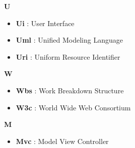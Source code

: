 {\huge \textbf{U}}
\begin{flushleft}
\begin{itemize}[label={}]
\item \textbf{Ui} : User Interface
\item \textbf{Uml} : Unified Modeling Language
\item \textbf{Uri} : Uniform Resource Identifier
\end{itemize}
\end{flushleft}
{\huge \textbf{W}}
\begin{flushleft}
\begin{itemize}[label={}]
\item \textbf{Wbs} : Work Breakdown Structure
\item \textbf{W3c} : World Wide Web Consortium
\end{itemize}
\end{flushleft}
{\huge \textbf{M}}
\begin{flushleft}
\begin{itemize}[label={}]
\item \textbf{Mvc} : Model View Controller
\end{itemize}
\end{flushleft}
